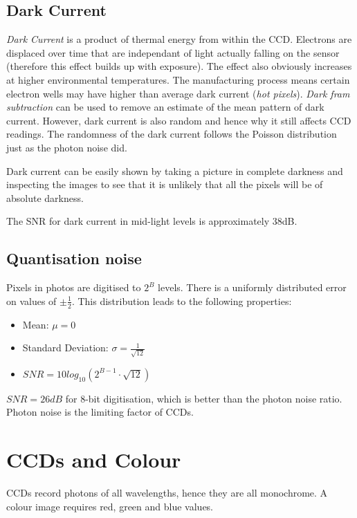 \documentclass{article}
\begin{document}
\subsection{Dark Current}
{\it Dark Current} is a product of thermal energy from within the CCD.
Electrons are displaced over time that are independant of light actually falling on the sensor (therefore this effect builds up with exposure).
The effect also obviously increases at higher environmental temperatures.
The manufacturing process means certain electron wells may have higher than average dark current ({\it hot pixels}).
{\it Dark fram subtraction} can be used to remove an estimate of the mean pattern of dark current.
However, dark current is also random and hence why it still affects CCD readings.
The randomness of the dark current follows the Poisson distribution just as the photon noise did.

Dark current can be easily shown by taking a picture in complete darkness and inspecting the images to see that it is unlikely that all the pixels will be of absolute darkness.

The SNR for dark current in mid-light levels is approximately 38dB.
\subsection{Quantisation noise}
Pixels in photos are digitised to $2^B$ levels. There is a uniformly distributed error on values of $\pm\frac{1}{2}$. This distribution leads to the following properties:
\begin{itemize}
	\item Mean: $\mu = 0$
	\item Standard Deviation: $\sigma =\frac{1}{\sqrt{12}}$ 
	\item $SNR = 10log_{10}(2^{B-1}\cdot \sqrt{12})$
\end{itemize}

$SNR = 26dB$ for 8-bit digitisation, which is better than  the photon noise ratio. Photon noise is the limiting factor of CCDs.
\section{CCDs and Colour}
CCDs record photons of all wavelengths, hence they are all monochrome.
A colour image requires red, green and blue values.
\end{document}
